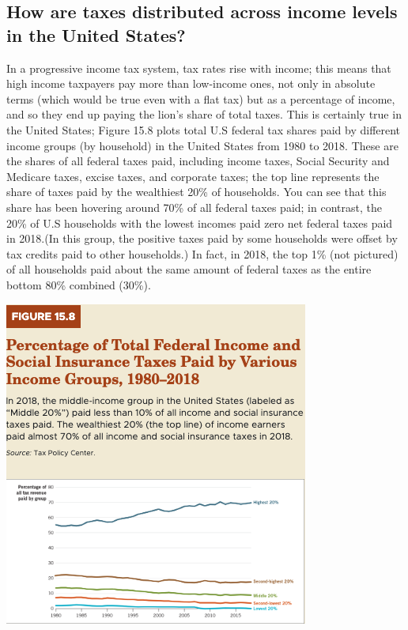 \documentclass[11pt]{article} %
\begin{document}
\subsection*{How are taxes distributed across income levels in the United States?}
In a progressive income tax system, tax rates rise with income; this means that high income taxpayers pay more than low-income ones, not only in absolute terms (which would be true even with a flat tax) but as a percentage of income, and so they end up paying the lion's share of total taxes. This is certainly true in the United States; Figure 15.8 plots total U.S federal tax shares paid by different income groups (by household) in the United States from 1980 to 2018. These are the shares of all federal taxes paid, including income taxes, Social Security and Medicare taxes, excise taxes, and corporate taxes; the top line represents the share of taxes paid by the wealthiest 20\% of households. You can see that this share has been hovering around 70\% of all federal taxes paid; in contrast, the 20\% of U.S households with the lowest incomes paid zero net federal taxes paid in 2018.(In this group, the positive taxes paid by some households were offset by tax credits paid to other households.) In fact, in 2018, the top 1\% (not pictured) of all households paid about the same amount of federal taxes as the entire bottom 80\% combined (30\%).

\begin{center}
\includegraphics[scale=0.7]{images/Figure 15.8.png}
\end{center}
\end{document}

